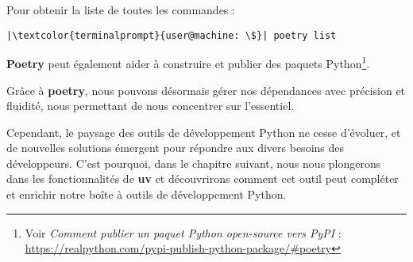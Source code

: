 Pour obtenir la liste de toutes les commandes :
\begin{lstlisting}[style=terminal]
|\textcolor{terminalprompt}{user@machine: \$}| poetry list
\end{lstlisting}

\textbf{Poetry} peut également aider à construire et publier des paquets Python\footnote{Voir \og \textit{Comment publier un paquet Python open-source vers PyPI}\fg{} : \url{https://realpython.com/pypi-publish-python-package/\#poetry}}.
\bigskip

\begin{center}
\end{center}

Grâce à \textbf{poetry}, nous pouvons désormais gérer nos dépendances avec précision et fluidité, nous permettant de nous concentrer sur l'essentiel.

Cependant, le paysage des outils de développement Python ne cesse d'évoluer, et de nouvelles solutions émergent pour répondre aux divers besoins des développeurs. C'est pourquoi, dans le chapitre suivant, nous nous plongerons dans les fonctionnalités de \textbf{uv} et découvrirons comment cet outil peut compléter et enrichir notre boîte à outils de développement Python. 

